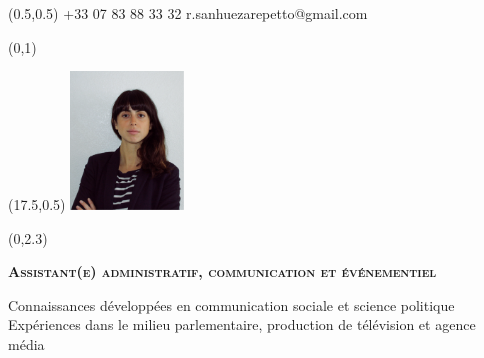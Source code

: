 \documentclass[30pt, french]{tccv}
\begin{document}
\begin{upshape}
\fontsize{9pt}{1em}\color{text}\selectfont



%
%




\begin{textblock}{6.5}(0.5,0.5)
    {+33 07 83 88 33 32}
    {r.sanhuezarepetto@gmail.com}
\end{textblock}

\begin{textblock}{21}(0,1)
\end{textblock}

\begin{textblock}{21}(17.5,0.5)
		\includegraphics[width=3cm]{../Figure/Rocio3.png}
\end{textblock}  



\begin{textblock}{21}(0,2.3)

\begin{center}
\fontsize{10pt}{1.5em}\color{text}\bodyfontlight\upshape\selectfont

	{\fontsize{14pt}{5em}\scshape\bfseries Assistant(e) administratif, communication 
	et événementiel  \\} 

	\vspace{5pt}
Connaissances développées en communication sociale et science politique 			\\
Expériences dans le milieu parlementaire, production de télévision et agence média		 	\\


\end{center}
\end{textblock}
\end{upshape}
\end{document}
